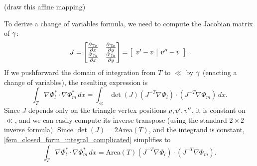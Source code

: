 \vskip 0.2in
(draw this affine mapping)
\vskip 0.2in

To derive a change of variables formula, we need to compute the Jacobian matrix of $\gamma$:
$$
    J = \begin{bmatrix} \frac{\partial \gamma_x}{\partial x} & \frac{\partial \gamma_x}{\partial y} \\ 
                        \frac{\partial \gamma_y}{\partial x} & \frac{\partial \gamma_y}{\partial y} \end{bmatrix}
      =
        \left[
        \begin{array}{c|c}
            v^{\prime} - v & v^{\prime\prime} - v
        \end{array}
        \right].
$$
If we pushforward the domain of integration from $T$ to $\ll$ by $\gamma$ (enacting a change of variables),
the resulting expression is
\begin{equation}\label{fem_closed_form_integral_complicated}
    \int_T \nabla\Phi_l^* \cdot \nabla\Phi_m^*\,dx
        = \int_\ll \det(J)(J^{-T}\nabla\Phi_l)\cdot(J^{-T}\nabla\Phi_m)\,dx.
\end{equation}
Since $J$ depends only on the triangle vertex positions $v,v^{\prime},v^{\prime\prime}$, it is constant on $\ll$, and we can easily compute its inverse transpose
(using the standard $2 \times 2$ inverse formula). Since $\det(J) = 2\text{Area}(T)$, and the integrand is constant,
\eqref{fem_closed_form_integral_complicated} simplifies to
\begin{equation}\label{fem_closed_form_integral}
    \int_T \nabla\Phi_l^* \cdot \nabla\Phi_m^*\,dx
        = \text{Area}(T)(J^{-T}\nabla\Phi_l)\cdot(J^{-T}\nabla\Phi_m).
\end{equation}





